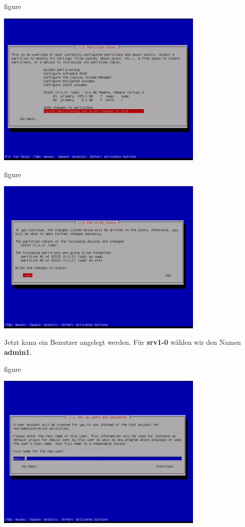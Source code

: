\begin{nofloat}{figure}
\begin{center}
\includegraphics[width=0.75\textwidth]{screenshots/25_ubuntu_install.png}
\end{center}
\end{nofloat}

\begin{nofloat}{figure}
\begin{center}
\includegraphics[width=0.75\textwidth]{screenshots/26_ubuntu_install.png}
\end{center}
\end{nofloat}
\newpage
Jetzt kann ein Benutzer angelegt werden. Für \textbf{srv1-0} wählen wir den
Namen \textbf{admin1}.

\begin{nofloat}{figure}
\begin{center}
\includegraphics[width=0.75\textwidth]{screenshots/27_ubuntu_install.png}
\end{center}
\end{nofloat}

